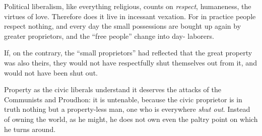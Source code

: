 Political liberalism, like everything religious, counts on \textit{respect}, 
humaneness, the virtues of love. Therefore does it live in incessant vexation. 
For in practice people respect nothing, and every day the small possessions 
are bought up again by greater proprietors, and the ``free people'' change 
into day- laborers.

If, on the contrary, the ``small proprietors'' had reflected that the great 
property was also theirs, they would not have respectfully shut themselves out 
from it, and would not have been shut out.

Property as the civic liberals understand it deserves the attacks of the 
Communists and Proudhon: it is untenable, because the civic proprietor is in 
truth nothing but a property-less man, one who is everywhere \textit{shut 
out}. Instead of owning the world, as he might, he does not own even the 
paltry point on which he turns around.

